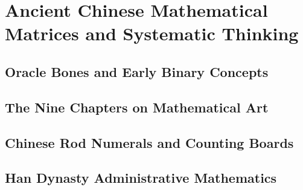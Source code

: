 


\chapter{Ancient Chinese Mathematical Matrices and Systematic Thinking}

\section{Oracle Bones and Early Binary Concepts}

\section{The Nine Chapters on Mathematical Art}

\section{Chinese Rod Numerals and Counting Boards}

\section{Han Dynasty Administrative Mathematics}
